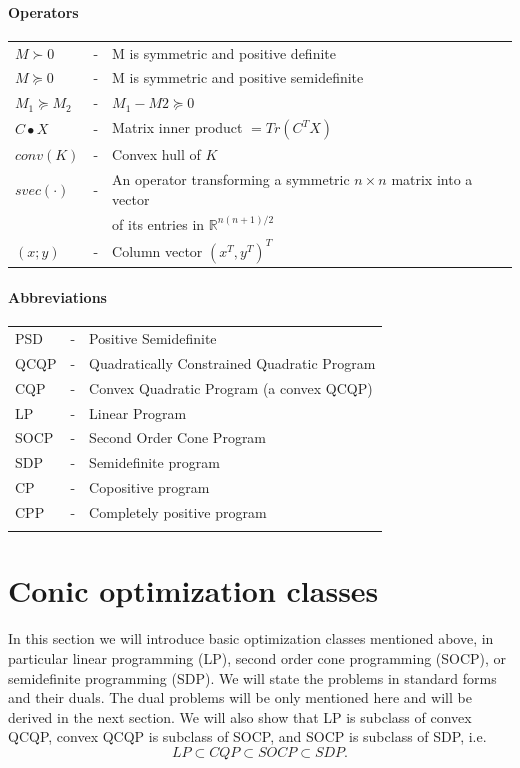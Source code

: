 \documentclass[12pt]{book}
\theoremstyle{definition}
\begin{document}
\subsubsection{Operators}
\begin{tabular}{lcl}
$M\succ 0$ &-& M is symmetric and positive definite \\
$M\succeq 0$ &-& M is symmetric and positive semidefinite \\
$M_1 \succeq M_2$ &-& $M_1 - M2\succeq 0$ \\
$C\bullet X$ &-& Matrix inner product $=Tr(C^TX)$ \\

$conv(K)$ &-& Convex hull of $K$ \\
$svec(\cdot)$ &-& An operator transforming a symmetric $n\times n$  matrix into a vector \\& &  of its entries in $\mathbb{R}^{n(n+1)/2}$ \\
$(x;y)$ &-& Column vector $(x^T,y^T)^T$
\end{tabular}

\subsubsection{Abbreviations}
\begin{tabular}{lcl}

PSD &-& Positive Semidefinite \\

QCQP &-& Quadratically Constrained Quadratic Program \\
CQP &-& Convex Quadratic Program (a convex QCQP) \\
LP &-& Linear Program \\
SOCP &-& Second Order Cone Program \\
SDP &-& Semidefinite program \\
CP &-& Copositive program \\
CPP &-& Completely positive program \\
& & \\ 
\end{tabular}





\chapter{Conic optimization classes}
\label{ConicOptClasses}

In this section we will introduce basic optimization classes mentioned above, in particular  linear programming (LP), second order cone programming  (SOCP), or semidefinite programming (SDP). We will state the problems in standard forms and their duals. The dual problems will be only mentioned here and will be derived in the next section. We will also show that LP is subclass of convex QCQP, convex QCQP is subclass of SOCP, and SOCP is subclass of SDP, i.e.
\begin{equation*}
LP\subset CQP \subset SOCP \subset SDP. %
\end{equation*}
\end{document}
